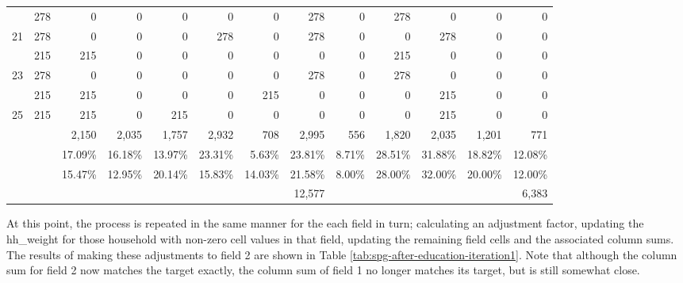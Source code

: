 \begin{sidewaystable}
\begin{tabular}{c*{12}{r}}
\gray 20 & 278 & 0 & 0 & 0 & 0 & 0 & 278 & 0 & 278 & 0 & 0 & 0 \\
21 & 278 & 0 & 0 & 0 & 278 & 0 & 278 & 0 & 0 & 278 & 0 & 0 \\
\gray 22 & 215 & 215 & 0 & 0 & 0 & 0 & 0 & 0 & 215 & 0 & 0 & 0 \\
23 & 278 & 0 & 0 & 0 & 0 & 0 & 278 & 0 & 278 & 0 & 0 & 0 \\
\gray 24 & 215 & 215 & 0 & 0 & 0 & 215 & 0 & 0 & 0 & 215 & 0 & 0 \\
25 & 215 & 215 & 0 & 215 & 0 & 0 & 0 & 0 & 0 & 215 & 0 & 0 \\
\hline
 &  & 2,150 & 2,035 & 1,757 & 2,932 & 708 & 2,995 & 556 & 1,820 & 2,035 & 1,201 & 771 \\
 &  & 17.09\% & 16.18\% & 13.97\% & 23.31\% & 5.63\% & 23.81\% & 8.71\% & 28.51\% & 31.88\% & 18.82\% & 12.08\% \\
\rowcolor{yellow!10} \cellcolor{white} & \cellcolor{white} & 15.47\% & 12.95\% & 20.14\% & 15.83\% & 14.03\% & 21.58\% & 8.00\% & 28.00\% & 32.00\% & 20.00\% & 12.00\% \\
 &  &  &  &  &  &  & 12,577 &  &  &  &  & 6,383 \\
\hline
\end{tabular}
\end{sidewaystable}

At this point, the process is repeated in the same manner for the each field in turn; calculating an adjustment factor, updating the hh\_weight for those household with non-zero cell values in that field, updating the remaining field cells and the associated column sums. The results of making these adjustments to field 2 are shown in Table \ref{tab:spg-after-education-iteration1}. Note that although the column sum for field 2 now matches the target exactly, the column sum of field 1 no longer matches its target, but is still somewhat close.

